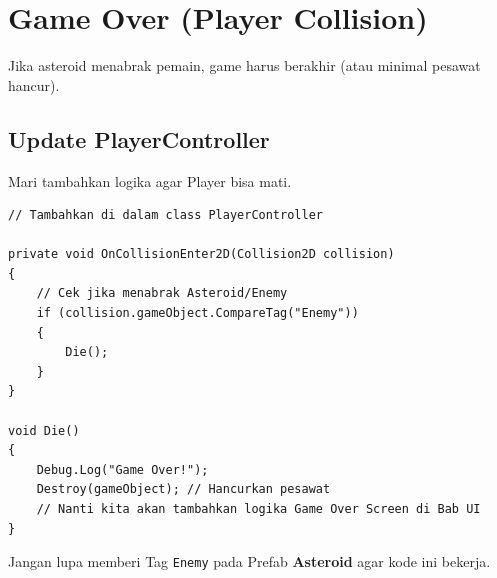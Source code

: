 
\section{Game Over (Player Collision)}

Jika asteroid menabrak pemain, game harus berakhir (atau minimal pesawat hancur).

\subsection{Update PlayerController}

Mari tambahkan logika agar Player bisa mati.

\begin{lstlisting}[language={[Sharp]C}]
// Tambahkan di dalam class PlayerController

private void OnCollisionEnter2D(Collision2D collision)
{
    // Cek jika menabrak Asteroid/Enemy
    if (collision.gameObject.CompareTag("Enemy")) 
    {
        Die();
    }
}

void Die()
{
    Debug.Log("Game Over!");
    Destroy(gameObject); // Hancurkan pesawat
    // Nanti kita akan tambahkan logika Game Over Screen di Bab UI
}
\end{lstlisting}

\begin{tips}
Jangan lupa memberi Tag \texttt{Enemy} pada Prefab \textbf{Asteroid} agar kode ini bekerja.
\end{tips}
